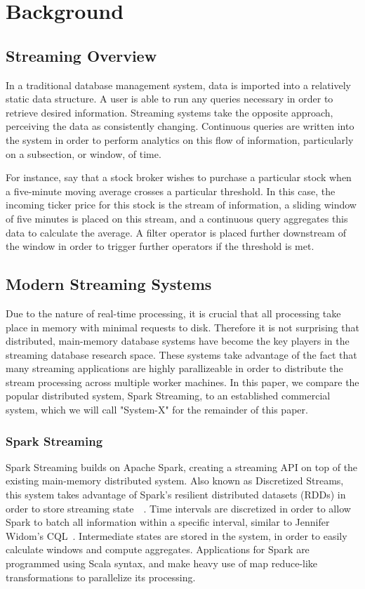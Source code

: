 \section{Background}
\subsection{Streaming Overview}
In a traditional database management system, data is imported into a relatively static data structure.  A user is able to run any queries necessary in order to retrieve desired information.  Streaming systems take the opposite approach, perceiving the data as consistently changing.  Continuous queries are written into the system in order to perform analytics on this flow of information, particularly on a subsection, or window, of time.~\cite{aurora}

For instance, say that a stock broker wishes to purchase a particular stock when a five-minute moving average crosses a particular threshold.  In this case, the incoming ticker price for this stock is the stream of information, a sliding window of five minutes is placed on this stream, and a continuous query aggregates this data to calculate the average.  A filter operator is placed further downstream of the window in order to trigger further operators if the threshold is met.

\subsection{Modern Streaming Systems}
Due to the nature of real-time processing, it is crucial that all processing take place in memory with minimal requests to disk.  Therefore it is not surprising that distributed, main-memory database systems have become the key players in the streaming database research space.  These systems take advantage of the fact that many streaming applications are highly parallizeable in order to distribute the stream processing across multiple worker machines.  In this paper, we compare the popular distributed system, Spark Streaming, to an established commercial system, which we will call "System-X" for the remainder of this paper.

\subsubsection{Spark Streaming}
Spark Streaming builds on Apache Spark, creating a streaming API on top of the existing main-memory distributed system.  Also known as Discretized Streams, this system takes advantage of Spark's resilient distributed datasets (RDDs) in order to store streaming state~\cite{dstreams}~\cite{rdd}.  Time intervals are discretized in order to allow Spark to batch all information within a specific interval, similar to Jennifer Widom's CQL~\cite{cql}.  Intermediate states are stored in the system, in order to easily calculate windows and compute aggregates.  Applications for Spark are programmed using Scala syntax, and make heavy use of map reduce-like transformations to parallelize its processing.

